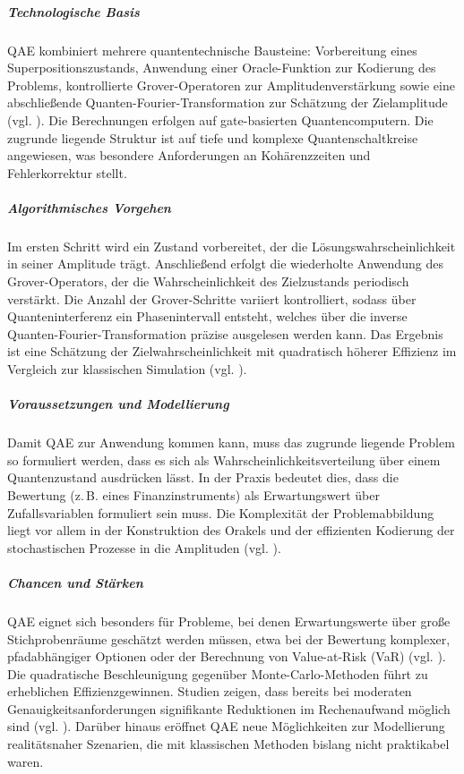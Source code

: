 \subparagraph{Technologische Basis}
QAE kombiniert mehrere quantentechnische Bausteine: Vorbereitung eines Superpositionszustands, Anwendung einer Oracle-Funktion zur Kodierung des Problems, kontrollierte Grover-Operatoren zur Amplitudenverstärkung sowie eine abschließende Quanten-Fourier-Transformation zur Schätzung der Zielamplitude (vgl. \cite{martin_new_2025}). Die Berechnungen erfolgen auf gate-basierten Quantencomputern. Die zugrunde liegende Struktur ist auf tiefe und komplexe Quantenschaltkreise angewiesen, was besondere Anforderungen an Kohärenzzeiten und Fehlerkorrektur stellt.

\subparagraph{Algorithmisches Vorgehen}
Im ersten Schritt wird ein Zustand vorbereitet, der die Lösungswahrscheinlichkeit in seiner Amplitude trägt. Anschließend erfolgt die wiederholte Anwendung des Grover-Operators, der die Wahrscheinlichkeit des Zielzustands periodisch verstärkt. Die Anzahl der Grover-Schritte variiert kontrolliert, sodass über Quanteninterferenz ein Phasenintervall entsteht, welches über die inverse Quanten-Fourier-Transformation präzise ausgelesen werden kann. Das Ergebnis ist eine Schätzung der Zielwahrscheinlichkeit mit quadratisch höherer Effizienz im Vergleich zur klassischen Simulation (vgl. \cite{stamatopoulos_option_2020, martin_new_2025}).

\subparagraph{Voraussetzungen und Modellierung}
Damit QAE zur Anwendung kommen kann, muss das zugrunde liegende Problem so formuliert werden, dass es sich als Wahrscheinlichkeitsverteilung über einem Quantenzustand ausdrücken lässt. In der Praxis bedeutet dies, dass die Bewertung (z.\,B. eines Finanzinstruments) als Erwartungswert über Zufallsvariablen formuliert sein muss. Die Komplexität der Problemabbildung liegt vor allem in der Konstruktion des Orakels und der effizienten Kodierung der stochastischen Prozesse in die Amplituden (vgl. \cite{rebentrost_quantum_2018}).

\subparagraph{Chancen und Stärken}
QAE eignet sich besonders für Probleme, bei denen Erwartungswerte über große Stichprobenräume geschätzt werden müssen, etwa bei der Bewertung komplexer, pfadabhängiger Optionen oder der Berechnung von Value-at-Risk (VaR) (vgl. \cite{orus_quantum_2019}). Die quadratische Beschleunigung gegenüber Monte-Carlo-Methoden führt zu erheblichen Effizienzgewinnen. Studien zeigen, dass bereits bei moderaten Genauigkeitsanforderungen signifikante Reduktionen im Rechenaufwand möglich sind (vgl. \cite{rebentrost_quantum_2018, egger_quantum_2020}). Darüber hinaus eröffnet QAE neue Möglichkeiten zur Modellierung realitätsnaher Szenarien, die mit klassischen Methoden bislang nicht praktikabel waren.

